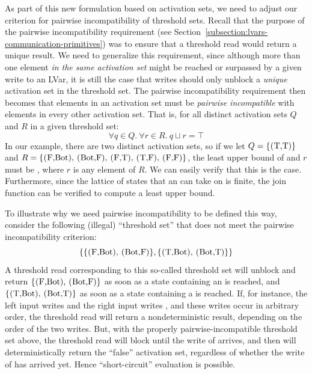 As part of this new formulation based on activation sets, we need to
adjust our criterion for pairwise incompatibility of threshold sets.
Recall that the purpose of the pairwise incompatibility requirement
(see Section~\ref{subsection:lvars-communication-primitives}) was to
ensure that a threshold read would return a unique result.  We need to
generalize this requirement, since although more than one element
\emph{in the same activation set} might be reached or surpassed by a
given write to an LVar, it is still the case that writes should only
unblock a \emph{unique} activation set in the threshold set.  The
pairwise incompatibility requirement then becomes that elements in an
activation set must be \emph{pairwise incompatible} with elements in
every other activation set.  That is, for all distinct activation sets
$Q$ and $R$ in a given threshold set:
%
\[ \forall q \in Q.~\forall r \in R.~q \sqcup r = \top \]
%
In our  example, there are two distinct activation sets, so
if we let $Q = \{ \textrm{\il{(T,T)}} \}$ and $R = \{
\textrm{\il{(F,Bot)}, \il{(Bot,F)}, \il{(F,T)}, \il{(T,F)},
  \il{(F,F)}} \}$, the least upper bound of  and $r$ must be
, where $r$ is any element of $R$.  We can easily verify that
this is the case.  Furthermore, since the lattice of states that an
 can take on is finite, the join function can be verified to
compute a least upper bound.

To illustrate why we need pairwise incompatibility to be defined this
way, consider the following (illegal) ``threshold set'' that does not
meet the pairwise incompatibility criterion:
\[
\{ 
\{ \textrm{\il{(F,Bot)}, \il{(Bot,F)}} \},
\{ \textrm{\il{(T,Bot)}, \il{(Bot,T)}} \}
\}
\]
A threshold read corresponding to this so-called threshold set will
unblock and return $\{ \textrm{\il{(F,Bot)}, \il{(Bot,F)}} \}$ as soon
as a state containing an  is reached, and $\{
\textrm{\il{(T,Bot)}, \il{(Bot,T)}} \}$ as soon as a state containing
a  is reached.  If, for instance, the left input writes
 and the right input writes , and these writes
occur in arbitrary order, the threshold read will return a
nondeterministic result, depending on the order of the two writes.
But, with the properly pairwise-incompatible threshold set above, the
threshold read will block until the write of  arrives, and
then will deterministically return the ``false'' activation set,
regardless of whether the write of  has arrived yet.
Hence ``short-circuit'' evaluation is possible.

